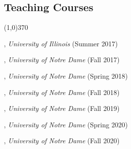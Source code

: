 \documentclass[10pt]{article}
\newenvironment{myindentpar}[1]%
{\begin{list}{}%
         {\setlength{\leftmargin}{#1}}%
         \item[]%
}
{\end{list}}
\newcounter{list}
\newcommand{\hide}[1]{}
\begin{document}
\subsection{\sc Teaching Courses}
\vspace{-0.4cm} \line(1,0){370} \vspace{-0.1cm}

\begin{myindentpar}{0.75cm}

\hspace{-0.75cm}{\bf CS 412 Introduction to Data Mining}, \emph{University of Illinois} (Summer 2017)
	
\hspace{-0.75cm}{\bf CSE 40647/60647 Data Science}, \emph{University of Notre Dame} (Fall 2017)

\hspace{-0.75cm}{\bf CSE 40647/60647 Data Science}, \emph{University of Notre Dame} (Spring 2018)

\hspace{-0.75cm}{\bf CSE 40647/60647 Data Science}, \emph{University of Notre Dame} (Fall 2018)

\hspace{-0.75cm}{\bf CSE 40647/60647 Data Science}, \emph{University of Notre Dame} (Fall 2019)

\hspace{-0.75cm}{\bf CSE 60326 Computational Behavior Modeling}, \emph{University of Notre Dame} (Spring 2020)

\hspace{-0.75cm}{\bf CSE 40647/60647 Data Science}, \emph{University of Notre Dame} (Fall 2020)

\end{myindentpar}

\hide{
\subsection{\sc Media Coverage}
\vspace{-0.4cm} \line(1,0){370} \vspace{-0.1cm}

\begin{myindentpar}{0.75cm}
{\em With modern media, press coverage sometimes spreads far and wide. There are often more outlets reporting than can be captured. This section therefore lists only a representative article (or two) of the total press coverage.}

\hspace{-0.75cm} XXX (XXX 2019) 
\hspace{0.75cm}{\em XXX}

\hspace{-0.75cm} XXX (XXX 2019) 

\url{https://www.XXX.com/}

\end{myindentpar}
}
\end{document}
